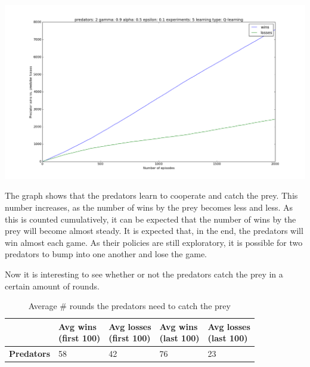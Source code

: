 \begin{center}
	\includegraphics[scale=0.3]{2_predators_q_learning}
\end{center}

The graph shows that the predators learn to cooperate and catch the prey. This number increases, as the number of wins by the prey becomes less and less. As this is counted cumulatively, it can be expected that the number of wins by the prey will become almost steady. It is expected that, in the end, the predators will win almost each game. As their policies are still exploratory, it is possible for two predators to bump into one another and lose the game.

Now it is interesting to see whether or not the predators catch the prey in a certain amount of rounds.

\begin{table}[H]
\begin{center}
\begin{tabular}{| l | l | l | l | l |}
\hline
 & \parbox{2cm}{\textbf{Avg wins \\ (first 100)}} & \parbox{2cm}{\textbf{Avg losses \\ (first 100)}} & \parbox{2cm}{\textbf{Avg wins \\ (last 100)}} & \parbox{2cm}{\textbf{Avg losses \\ (last 100)}} \\
\hline
\textbf{Predators} & 58 & 42 & 76 & 23 \\
\hline
\end{tabular}
\caption{Average \# rounds the predators need to catch the prey}
\end{center}
\end{table}

